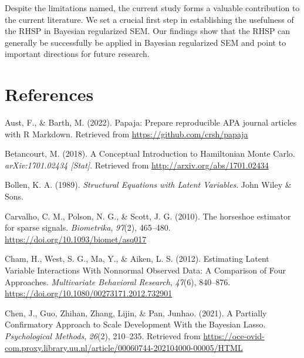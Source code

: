\documentclass[
  man, donotrepeattitle,floatsintext]{apa6}
\newlength{\cslhangindent}
\newlength{\cslentryspacingunit} %
\newenvironment{CSLReferences}[2] %
 {%
  \setlength{\parindent}{0pt}
  \ifodd #1
  \let\oldpar\par
  \def\par{\hangindent=\cslhangindent\oldpar}
  \fi
  \setlength{\parskip}{#2\cslentryspacingunit}
 }%
 {}
\begin{document}
Despite the limitations named, the current study forms a valuable contribution to the current literature. We set a crucial first step in establishing the usefulness of the RHSP in Bayesian regularized SEM. Our findings show that the RHSP can generally be successfully be applied in Bayesian regularized SEM and point to important directions for future research.

\clearpage

\hypertarget{references}{%
\section{References}\label{references}}

\begingroup
\setlength{\parindent}{-0.5in}
\setlength{\leftskip}{0.5in}

\hypertarget{refs}{}
\begin{CSLReferences}{1}{0}
\leavevmode{}%
Aust, F., \& Barth, M. (2022). Papaja: {Prepare} reproducible {APA} journal articles with {R} {Markdown}. Retrieved from \url{https://github.com/crsh/papaja}

\leavevmode{}%
Betancourt, M. (2018). A {Conceptual} {Introduction} to {Hamiltonian} {Monte} {Carlo}. \emph{arXiv:1701.02434 {[}Stat{]}}. Retrieved from \url{http://arxiv.org/abs/1701.02434}

\leavevmode{}%
Bollen, K. A. (1989). \emph{Structural {Equations} with {Latent} {Variables}}. John Wiley \& Sons.

\leavevmode{}%
Carvalho, C. M., Polson, N. G., \& Scott, J. G. (2010). The horseshoe estimator for sparse signals. \emph{Biometrika}, \emph{97}(2), 465--480. \url{https://doi.org/10.1093/biomet/asq017}

\leavevmode{}%
Cham, H., West, S. G., Ma, Y., \& Aiken, L. S. (2012). Estimating {Latent} {Variable} {Interactions} {With} {Nonnormal} {Observed} {Data}: {A} {Comparison} of {Four} {Approaches}. \emph{Multivariate Behavioral Research}, \emph{47}(6), 840--876. \url{https://doi.org/10.1080/00273171.2012.732901}

\leavevmode{}%
Chen, J., Guo, Zhihan, Zhang, Lijin, \& Pan, Junhao. (2021). A {Partially} {Confirmatory} {Approach} to {Scale} {Development} {With} the {Bayesian} {Lasso}. \emph{Psychological Methods}, \emph{26}(2), 210--235. Retrieved from \url{https://oce-ovid-com.proxy.library.uu.nl/article/00060744-202104000-00005/HTML}


\end{CSLReferences}
\end{document}
